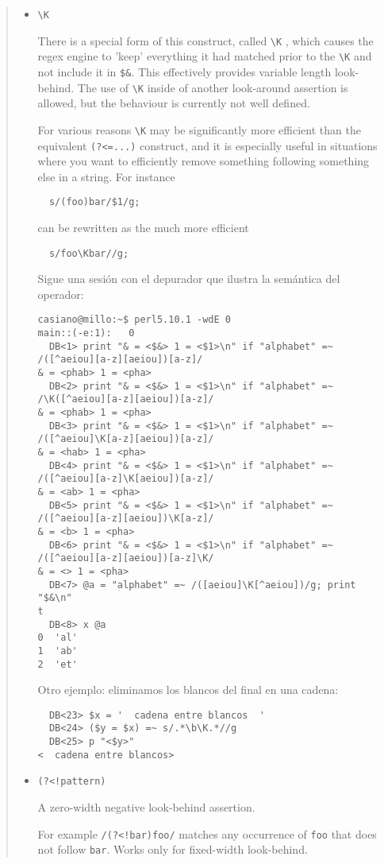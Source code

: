 \begin{it}
\begin{quotation}
\begin{itemize}
For example, \verb#/(?<=\t)\w+/#
matches a word that follows a tab, without including the tab in \verb|$&|. 
Works only for fixed-width look-behind.

\item \verb|\K| 

There is a special form of this construct, called \verb|\K| , which causes
the regex engine to 'keep' everything it had matched prior to the \verb|\K|
and not include it in \verb|$&|. This effectively provides variable length
look-behind. The use of \verb|\K| inside of another look-around assertion is
allowed, but the behaviour is currently not well defined.

For various reasons \verb|\K| may be significantly more efficient than the
equivalent \verb|(?<=...)| construct, and it is especially useful in situations
where you want to efficiently remove something following something else
in a string. For instance
\begin{verbatim}
  s/(foo)bar/$1/g;
\end{verbatim}

can be rewritten as the much more efficient
\begin{verbatim}
  s/foo\Kbar//g;
\end{verbatim}

Sigue una sesión con el depurador que ilustra la semántica
del operador:

\begin{verbatim}
casiano@millo:~$ perl5.10.1 -wdE 0
main::(-e:1):   0
  DB<1> print "& = <$&> 1 = <$1>\n" if "alphabet" =~ /([^aeiou][a-z][aeiou])[a-z]/
& = <phab> 1 = <pha>
  DB<2> print "& = <$&> 1 = <$1>\n" if "alphabet" =~ /\K([^aeiou][a-z][aeiou])[a-z]/
& = <phab> 1 = <pha>
  DB<3> print "& = <$&> 1 = <$1>\n" if "alphabet" =~ /([^aeiou]\K[a-z][aeiou])[a-z]/
& = <hab> 1 = <pha>
  DB<4> print "& = <$&> 1 = <$1>\n" if "alphabet" =~ /([^aeiou][a-z]\K[aeiou])[a-z]/
& = <ab> 1 = <pha>
  DB<5> print "& = <$&> 1 = <$1>\n" if "alphabet" =~ /([^aeiou][a-z][aeiou])\K[a-z]/
& = <b> 1 = <pha>
  DB<6> print "& = <$&> 1 = <$1>\n" if "alphabet" =~ /([^aeiou][a-z][aeiou])[a-z]\K/
& = <> 1 = <pha>
  DB<7> @a = "alphabet" =~ /([aeiou]\K[^aeiou])/g; print "$&\n"
t
  DB<8> x @a
0  'al'
1  'ab'
2  'et'
\end{verbatim}

Otro ejemplo: eliminamos los blancos del final en una cadena:
\begin{verbatim}
  DB<23> $x = '  cadena entre blancos  '
  DB<24> ($y = $x) =~ s/.*\b\K.*//g
  DB<25> p "<$y>"
<  cadena entre blancos>
\end{verbatim}

\item \verb|(?<!pattern)| 

A zero-width negative look-behind assertion. 

For example \verb|/(?<!bar)foo/| matches any occurrence of 
 \verb"foo" that does not follow \verb"bar". Works only for fixed-width look-behind.
\end{itemize}

\end{quotation}
\end{it}


